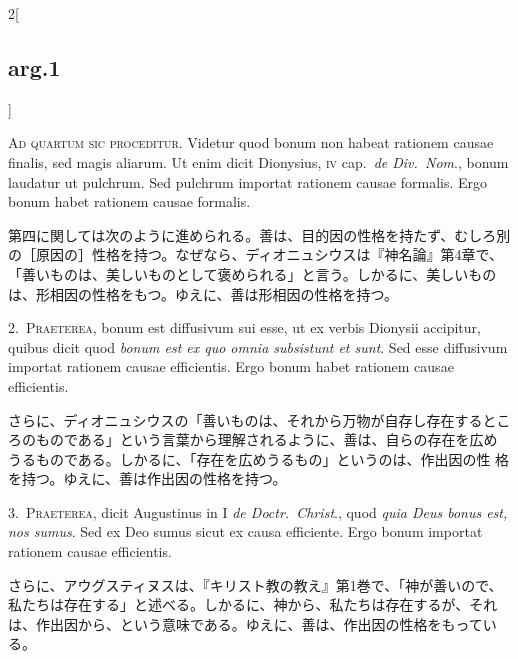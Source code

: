 \documentclass[paper=a4paper,fontsize=10pt,jafontsize=9pt,titlepage]{jlreq}
\begin{document}
\begin{paracol}{2}[\subsection{arg.1}]

{\huge A}{\scshape d quartum sic proceditur}. Videtur quod bonum non
 habeat rationem causae finalis, sed magis aliarum. Ut enim dicit
 Dionysius, {\scshape iv} cap.~{\itshape de Div.~Nom}., bonum laudatur
 ut pulchrum{\itshape }. Sed pulchrum importat rationem causae
 formalis. Ergo bonum habet rationem causae formalis.

\switchcolumn

第四に関しては次のように進められる。善は、目的因の性格を持たず、むしろ別
 の［原因の］性格を持つ。なぜなら、ディオニュシウスは『神名論』第4章で、
 「善いものは、美しいものとして褒められる」と言う。しかるに、美しいもの
 は、形相因の性格をもつ。ゆえに、善は形相因の性格を持つ。


2.~{\scshape Praeterea}, bonum est diffusivum sui esse, ut ex verbis
 Dionysii accipitur, quibus dicit quod {\itshape bonum est ex quo omnia
 subsistunt et sunt}. Sed esse diffusivum importat rationem causae
 efficientis. Ergo bonum habet rationem causae efficientis.

\switchcolumn

さらに、ディオニュシウスの「善いものは、それから万物が自存し存在するとこ
 ろのものである」という言葉から理解されるように、善は、自らの存在を広め
 うるものである。しかるに、「存在を広めうるもの」というのは、作出因の性
 格を持つ。ゆえに、善は作出因の性格を持つ。


3.~{\scshape Praeterea}, dicit Augustinus in I {\itshape de
 Doctr.~Christ}., quod {\itshape quia Deus bonus est, nos sumus}. Sed ex
 Deo sumus sicut ex causa efficiente. Ergo bonum importat rationem
 causae efficientis.

\switchcolumn

さらに、アウグスティヌスは、『キリスト教の教え』第1巻で、「神が善いので、
 私たちは存在する」と述べる。しかるに、神から、私たちは存在するが、それ
 は、作出因から、という意味である。ゆえに、善は、作出因の性格をもってい
 る。


\end{paracol}
\end{document}
